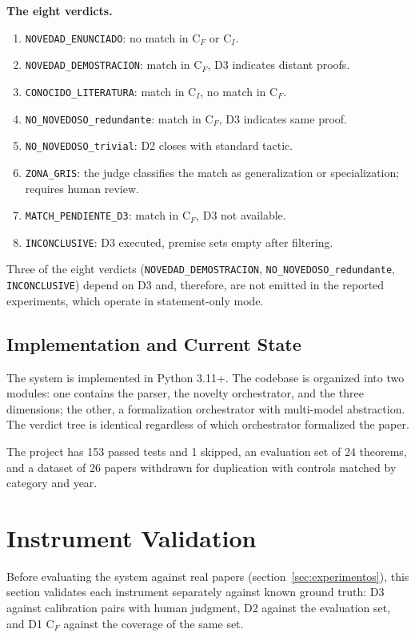 \documentclass[12pt,a4paper]{article}
\theoremstyle{remark}
\begin{document}
\textbf{The eight verdicts.}

\begin{enumerate}
\item \texttt{NOVEDAD\_ENUNCIADO}: no match in C$_F$ or C$_I$.
\item \texttt{NOVEDAD\_DEMOSTRACION}: match in C$_F$, D3 indicates distant proofs.
\item \texttt{CONOCIDO\_LITERATURA}: match in C$_I$, no match in C$_F$.
\item \texttt{NO\_NOVEDOSO\_redundante}: match in C$_F$, D3 indicates same proof.
\item \texttt{NO\_NOVEDOSO\_trivial}: D2 closes with standard tactic.
\item \texttt{ZONA\_GRIS}: the judge classifies the match as generalization or specialization; requires human review.
\item \texttt{MATCH\_PENDIENTE\_D3}: match in C$_F$, D3 not available.
\item \texttt{INCONCLUSIVE}: D3 executed, premise sets empty after filtering.
\end{enumerate}

Three of the eight verdicts (\texttt{NOVEDAD\_DEMOSTRACION}, \texttt{NO\_NOVEDOSO\_redundante}, \texttt{INCONCLUSIVE}) depend on D3 and, therefore, are not emitted in the reported experiments, which operate in statement-only mode.

\subsection{Implementation and Current State}

The system is implemented in Python 3.11+. The codebase is organized into two modules: one contains the parser, the novelty orchestrator, and the three dimensions; the other, a formalization orchestrator with multi-model abstraction. The verdict tree is identical regardless of which orchestrator formalized the paper.

The project has 153 passed tests and 1 skipped, an evaluation set of 24 theorems, and a dataset of 26 papers withdrawn for duplication with controls matched by category and year.


\section{Instrument Validation}

\label{sec:instrumentos}

Before evaluating the system against real papers (section~\ref{sec:experimentos}), this section validates each instrument separately against known ground truth: D3 against calibration pairs with human judgment, D2 against the evaluation set, and D1 C$_F$ against the coverage of the same set.
\end{document}
